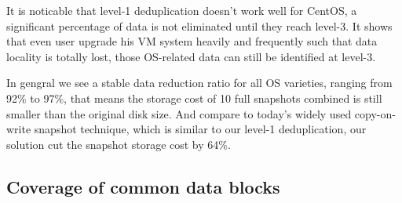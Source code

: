 It is noticable that level-1 deduplication doesn't work well for CentOS, a significant percentage of data is not
eliminated until they reach level-3. It shows that even user upgrade his VM system heavily and frequently
such that data locality is totally lost, those OS-related data can still be identified at level-3. 

In gengral we see a stable data reduction ratio for all OS varieties, ranging from 92\% to 97\%, that means
the storage cost of 10 full snapshots combined is still smaller than the original disk size. And compare to 
today's widely used copy-on-write snapshot technique, which is similar to our level-1 deduplication, our
solution cut the snapshot storage cost by 64\%.




\subsection{Coverage of common data blocks}



